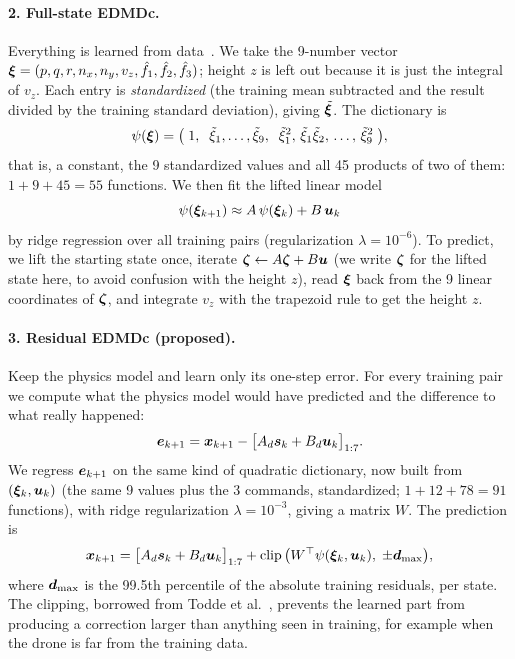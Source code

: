 \paragraph{2. Full-state EDMDc.} Everything is learned from data~\cite{williams2015edmd,korda2018linear}. We take the 9-number vector $\boldsymbol{\xi} = (p,q,r,n_x,n_y,v_z,\hat f_1,\hat f_2,\hat f_3)$; height $z$ is left out because it is just the integral of $v_z$. Each entry is \emph{standardized} (the training mean subtracted and the result divided by the training standard deviation), giving $\tilde{\boldsymbol{\xi}}$. The dictionary is
\begin{equation}
  \psi(\boldsymbol{\xi}) = \big(\;1,\;\; \tilde\xi_1,\dots,\tilde\xi_9,\;\; \tilde\xi_1^2,\, \tilde\xi_1\tilde\xi_2,\,\dots,\,\tilde\xi_9^2\;\big),
\end{equation}
that is, a constant, the 9 standardized values and all 45 products of two of them: $1 + 9 + 45 = 55$ functions. We then fit the lifted linear model
\begin{equation}
  \psi(\boldsymbol{\xi}_{k+1}) \approx A\,\psi(\boldsymbol{\xi}_k) + B\,\boldsymbol{u}_k
\end{equation}
by ridge regression over all training pairs (regularization $\lambda = 10^{-6}$). To predict, we lift the starting state once, iterate $\boldsymbol{\zeta}\leftarrow A\boldsymbol{\zeta} + B\boldsymbol{u}$ (we write $\boldsymbol{\zeta}$ for the lifted state here, to avoid confusion with the height $z$), read $\boldsymbol{\xi}$ back from the 9 linear coordinates of $\boldsymbol{\zeta}$, and integrate $v_z$ with the trapezoid rule to get the height $z$.

\paragraph{3. Residual EDMDc (proposed).} Keep the physics model and learn only its one-step error. For every training pair we compute what the physics model would have predicted and the difference to what really happened:
\begin{equation}
  \boldsymbol{e}_{k+1} = \boldsymbol{x}_{k+1} - \big[A_d\boldsymbol{s}_k + B_d\boldsymbol{u}_k\big]_{1:7}.
\end{equation}
We regress $\boldsymbol{e}_{k+1}$ on the same kind of quadratic dictionary, now built from $(\boldsymbol{\xi}_k, \boldsymbol{u}_k)$ (the same 9 values plus the 3 commands, standardized; $1 + 12 + 78 = 91$ functions), with ridge regularization $\lambda = 10^{-3}$, giving a matrix $W$. The prediction is
\begin{equation}
  \boldsymbol{x}_{k+1} = \big[A_d\boldsymbol{s}_k + B_d\boldsymbol{u}_k\big]_{1:7} + \operatorname{clip}\big(W^\top\psi(\boldsymbol{\xi}_k,\boldsymbol{u}_k),\; \pm\boldsymbol{d}_{\max}\big),
\end{equation}
where $\boldsymbol{d}_{\max}$ is the 99.5th percentile of the absolute training residuals, per state. The clipping, borrowed from Todde et al.~\cite{todde2026residual}, prevents the learned part from producing a correction larger than anything seen in training, for example when the drone is far from the training data.

